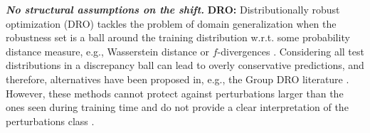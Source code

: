 \textbf{\textit{No structural assumptions on the shift.}}
\textbf{DRO:} Distributionally robust optimization (DRO) tackles the problem of domain generalization when the robustness set is a ball around the training distribution w.r.t. some probability distance measure, e.g., Wasserstein distance \cite{sinha2017certifying, mohajerin2018data} or $f$-divergences \citep{bental2013robust, duchi2021learning}.
Considering all test distributions in a discrepancy ball can lead to overly conservative predictions, and therefore, alternatives have been proposed in, e.g., the Group DRO literature \citep{sagawa2019distributionally,frogner2019incorporating, liu2022distributionally}.
However, these methods cannot protect against perturbations larger than the ones seen during training time and do not provide a clear interpretation of the perturbations class \cite{shen2023causalityoriented}.


